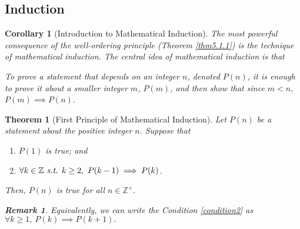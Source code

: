 \documentclass[12pt,a4paper]{article}
\newtheorem{thm}{Theorem}[subsection]
\newtheorem{cor}{Corollary}[subsection]
\newtheorem*{rmk}{\indent Remark}
\def\Z{{\mathbb{Z}}}
\def\Zp{{\Z^{+}}}
\def\st{\emph{ s.t. }}
\begin{document}
\subsection{Induction}
\begin{cor}[Introduction to Mathematical Induction]
	The most powerful consequence of the well-ordering	principle (Theorem \ref{thm5.1.1}) is the technique of mathematical induction. The central idea of mathematical induction is that \begin{center}\textit{To prove a statement that depends on an integer $n$, denoted $P(n)$, it is enough to prove it about a smaller integer $m$, $P(m)$, and then show that since $m<n,$ $P(m)\implies P(n)$.}\end{center}
\end{cor}
\begin{thm}[First Principle of Mathematical Induction]\label{induction}
	Let $P(n)$ be a statement about the positive integer $n.$ Suppose that 
	\begin{enumerate}
		\item $P(1)$ is true; and 
		\item\label{condition2} $\forall k\in\Z\st k\geq2,\ P(k-1)\implies P(k)$.
	\end{enumerate}	Then, $P(n)$ is true for all $n\in\Zp.$
	\begin{rmk} Equivalently, we can write the Condition \ref{condition2} as $\forall k\geq1,\ P(k)\implies P(k+1).$ \end{rmk}
\end{thm}
\end{document}
